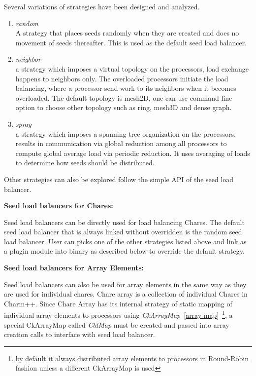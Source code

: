 Several variations of strategies have been designed and analyzed. 
\begin{enumerate}
\item {\em random}\\  
 A strategy that places seeds randomly when they are created and does
no movement of seeds thereafter. This is used as the default seed 
load balancer.
\item {\em neighbor}\\  
 a strategy which imposes a virtual topology on the processors,
 load exchange happens to neighbors only. The overloaded processors
 initiate the load balancing, where a processor send work to its neighbors
 when it becomes overloaded. The default topology is mesh2D, one can use
 command line option to choose other topology such as ring, mesh3D and 
 dense graph.
\item {\em spray}\\  
 a strategy which imposes a spanning tree organization on the processors,
 results in communication via global reduction among all processors 
 to compute global average load via periodic reduction. 
 It uses averaging of loads to determine how seeds should be
distributed.
\end{enumerate}

Other strategies can also be explored follow the simple API of the 
seed load balancer.
\linebreak

{\bf Seed load balancers for Chares:}

Seed load balancers can be directly used for load balancing Chares.
The default seed load balancer that is always linked without overridden 
is the random seed load balancer.
User can picks one of the other strategies listed above and link as a plugin
module into binary as described below to override the default strategy.

{\bf Seed load balancers for Array Elements:}

Seed load balancers can also be used for array elements in the same way 
as they are used for individual chares.
Chare array is a collection of individual Chares in Charm++.
Since Chare Array has its internal strategy of static mapping of individual
array elements to processors using {\em CkArrayMap}~\ref{array map}~\footnote{by default it always distributed array elements to processors in Round-Robin fashion unless a different CkArrayMap is used}, 
a special CkArrayMap called {\em CldMap} must be created and passed into
array creation calls to interface with seed load balancer.

